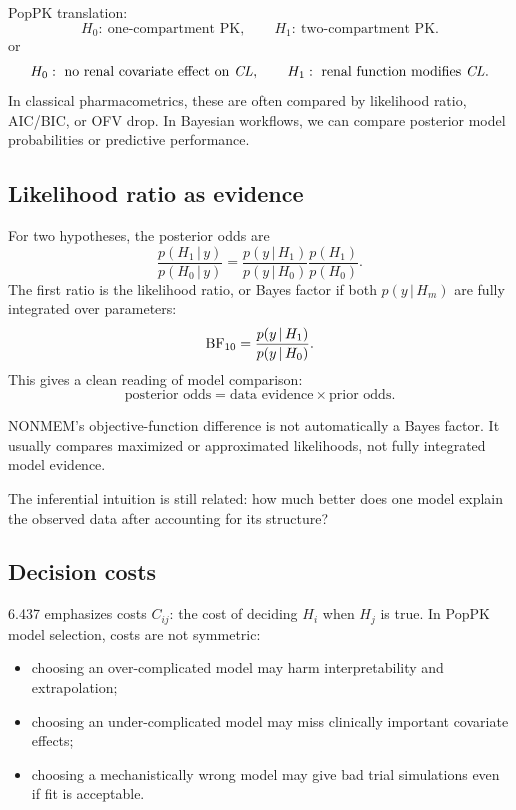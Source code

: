 \documentclass[a4paper]{article}
\newcommand{\given}{\,|\,}
\begin{document}
PopPK translation:
\[
  H_0:\ \text{one-compartment PK},
  \qquad
  H_1:\ \text{two-compartment PK}.
\]
or
\[
  H_0:\ \text{no renal covariate effect on }\pksym{CL},
  \qquad
  H_1:\ \text{renal function modifies }\pksym{CL}.
\]
In classical pharmacometrics, these are often compared by likelihood ratio, AIC/BIC, or OFV drop. In Bayesian workflows, we can compare posterior model probabilities or predictive performance.

\subsection{Likelihood ratio as evidence}

For two hypotheses, the posterior odds are
\[
  \frac{p(H_1\given y)}{p(H_0\given y)}
  =
  \frac{p(y\given H_1)}{p(y\given H_0)}
  \frac{p(H_1)}{p(H_0)}.
\]
The first ratio is the likelihood ratio, or Bayes factor if both \(p(y\given H_m)\) are fully integrated over parameters:
\[
  \pklab{BF}_{10}
  =
  \frac{p(y\given H_1)}{p(y\given H_0)}.
\]
This gives a clean reading of model comparison:
\[
  \text{posterior odds}
  =
  \text{data evidence}
  \times
  \text{prior odds}.
\]

\begin{remark}
  NONMEM's objective-function difference is not automatically a Bayes factor. It usually compares maximized or approximated likelihoods, not fully integrated model evidence.

  The inferential intuition is still related: how much better does one model explain the observed data after accounting for its structure?
\end{remark}

\subsection{Decision costs}

6.437 emphasizes costs \(C_{ij}\): the cost of deciding \(H_i\) when \(H_j\) is true. In PopPK model selection, costs are not symmetric:

\begin{itemize}[leftmargin=2em]
  \item choosing an over-complicated model may harm interpretability and extrapolation;
  \item choosing an under-complicated model may miss clinically important covariate effects;
  \item choosing a mechanistically wrong model may give bad trial simulations even if fit is acceptable.
\end{itemize}
\end{document}
